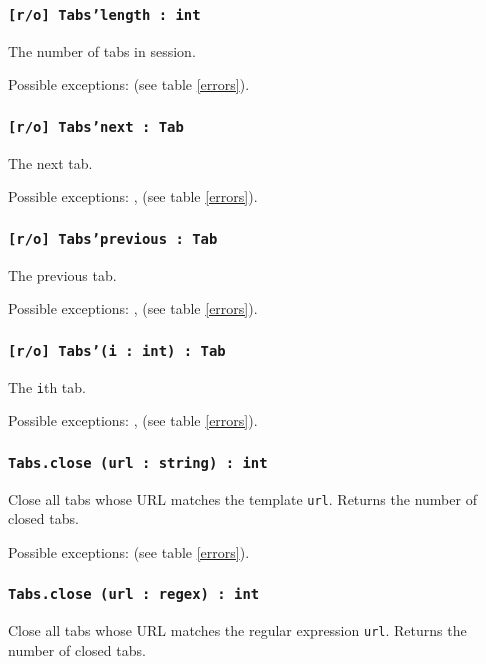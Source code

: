 \subsubsection{\texttt{[r/o] Tabs'length : int}}

The number of tabs in session.

Possible exceptions:  (see table \ref{errors}).

\subsubsection{\texttt{[r/o] Tabs'next : Tab}}

The next tab.

Possible exceptions: ,  (see table \ref{errors}).

\subsubsection{\texttt{[r/o] Tabs'previous : Tab}}

The previous tab.

Possible exceptions: ,  (see table \ref{errors}).

\subsubsection{\texttt{[r/o] Tabs'(i : int) : Tab}}

The \texttt{i}th tab.

Possible exceptions: ,  (see table \ref{errors}).

\subsubsection{\texttt{Tabs.close (url : string) : int}}

Close all tabs whose URL matches the template \texttt{url}. Returns the number of closed tabs.

Possible exceptions:  (see table \ref{errors}).

\subsubsection{\texttt{Tabs.close (url : regex) : int}}

Close all tabs whose URL matches the regular expression \texttt{url}. Returns the number of closed tabs.

